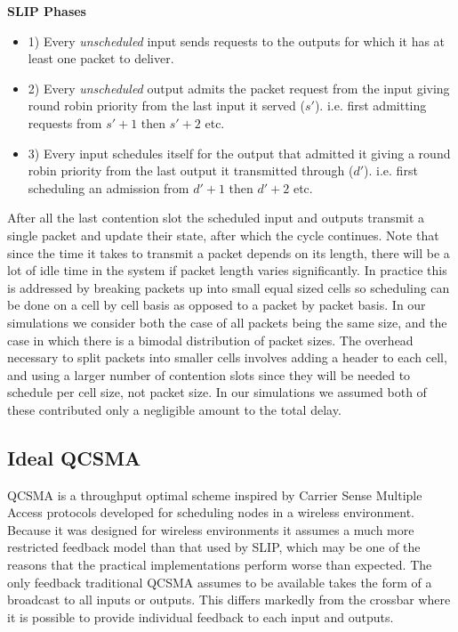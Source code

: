 \documentclass{IEEEtran}%
\begin{document}
{\bf SLIP Phases}
\begin{itemize}
\item 1) Every {\it unscheduled} input sends requests to the outputs for which it has at least one packet to deliver.
\item 2) Every {\it unscheduled} output admits the packet request from the input giving round robin priority from the last input it served ($s'$). i.e. first admitting requests from $s'+1$ then $s'+2$ etc.
\item 3) Every input schedules itself for the output that admitted it giving a round robin priority from the last output it transmitted through ($d'$).  i.e. first scheduling an admission from $d'+1$ then $d'+2$ etc.\\
\end{itemize}

After all the last contention slot the scheduled input and outputs transmit a single packet and update their state, after which the cycle continues.  Note that since the time it takes to transmit a packet depends on its length, there will be a lot of idle time in the system if packet length varies significantly.  In practice this is addressed by breaking packets up into small equal sized cells so scheduling can be done on a cell by cell basis as opposed to a packet by packet basis.  In our simulations we consider both the case of all packets being the same size, and the case in which there is a bimodal distribution of packet sizes.  The overhead necessary to split packets into smaller cells involves adding a header to each cell, and using a larger number of contention slots since they will be needed to schedule per cell size, not packet size.  In our simulations we assumed both of these contributed only a negligible amount to the total delay.

\subsection{Ideal QCSMA}


QCSMA is a throughput optimal scheme inspired by Carrier Sense Multiple Access protocols developed for scheduling nodes in a wireless environment.  Because it was designed for wireless environments it assumes a much more restricted feedback model than that used by SLIP, which may be one of the reasons that the practical implementations perform worse than expected.  The only feedback traditional QCSMA assumes to be available takes the form of a broadcast to all inputs or outputs. This differs markedly from the crossbar where it is possible to provide individual feedback to each input and outputs.%
\end{document}
